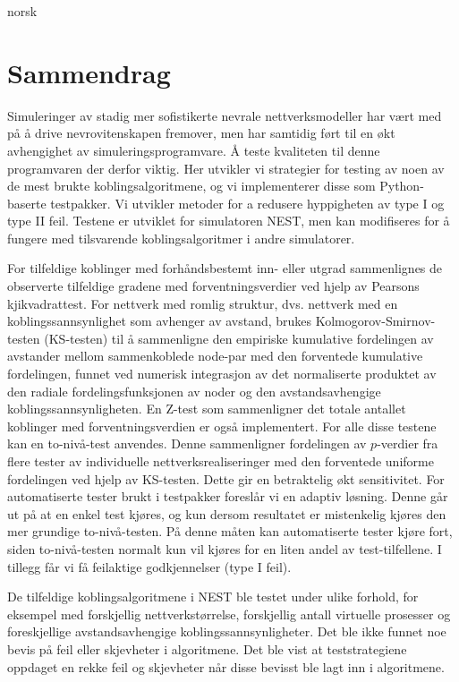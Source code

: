 
\begin{otherlanguage*}{norsk}

\chapter{Sammendrag}


Simuleringer av stadig mer sofistikerte nevrale nettverksmodeller har vært med på å drive nevrovitenskapen fremover, men har samtidig ført til en økt avhengighet av simuleringsprogramvare. Å teste kvaliteten til denne programvaren der derfor viktig. Her utvikler vi strategier for testing av noen av de mest brukte koblingsalgoritmene, og vi implementerer disse som Python-baserte testpakker. Vi utvikler metoder for a redusere hyppigheten av type I og type II feil. Testene er utviklet for simulatoren NEST, men kan modifiseres for å fungere med tilsvarende koblingsalgoritmer i andre simulatorer. 


For tilfeldige koblinger med forhåndsbestemt inn- eller utgrad sammenlignes de observerte tilfeldige gradene med forventningsverdier ved hjelp av Pearsons kjikvadrattest. For nettverk med romlig struktur, dvs. nettverk med en koblingssannsynlighet som avhenger av avstand, brukes Kolmogorov-Smirnov-testen (KS-testen) til å sammenligne den empiriske kumulative fordelingen av avstander mellom sammenkoblede node-par med den forventede kumulative fordelingen, funnet ved numerisk integrasjon av det normaliserte produktet av den radiale fordelingsfunksjonen av noder og den avstandsavhengige koblingssannsynligheten. En Z-test som sammenligner det totale antallet koblinger med forventningsverdien er også implementert. For alle disse testene kan en to-nivå-test anvendes. Denne sammenligner fordelingen av $p$-verdier fra flere tester av individuelle nettverksrealiseringer med den forventede uniforme fordelingen ved hjelp av KS-testen. Dette gir en betraktelig økt sensitivitet. For automatiserte tester brukt i testpakker foreslår vi en adaptiv løsning. Denne går ut på at en enkel test kjøres, og kun dersom resultatet er mistenkelig kjøres den mer grundige to-nivå-testen. På denne måten kan automatiserte tester kjøre fort, siden to-nivå-testen normalt kun vil kjøres for en liten andel av test-tilfellene. I tillegg får vi få feilaktige godkjennelser (type I feil).


De tilfeldige koblingsalgoritmene i NEST ble testet under ulike forhold, for eksempel med forskjellig nettverkstørrelse, forskjellig antall virtuelle prosesser og foreskjellige avstandsavhengige koblingssannsynligheter. Det ble ikke funnet noe bevis på feil eller skjevheter i algoritmene. Det ble vist at teststrategiene oppdaget en rekke feil og skjevheter når disse bevisst ble lagt inn i algoritmene. 



\end{otherlanguage*}

\clearchapter

